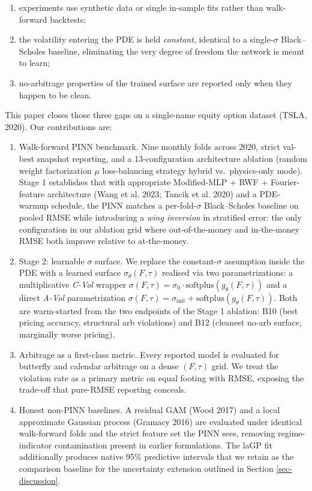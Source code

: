 \documentclass[
  11pt,
]{article}
\providecommand{\tightlist}{%
  \setlength{\itemsep}{0pt}\setlength{\parskip}{0pt}}
\begin{document}
\begin{enumerate}
\def\labelenumi{\arabic{enumi}.}
\tightlist
\item
  experiments use synthetic data or single in-sample fits rather than
  walk-forward backtests;
\item
  the volatility entering the PDE is held \emph{constant}, identical to
  a single-\(\sigma\) Black--Scholes baseline, eliminating the very
  degree of freedom the network is meant to learn;
\item
  no-arbitrage properties of the trained surface are reported only when
  they happen to be clean.
\end{enumerate}

This paper closes those three gaps on a single-name equity option
dataset (TSLA, 2020). Our contributions are:

\begin{enumerate}
\def\labelenumi{\arabic{enumi}.}
\item
  Walk-forward PINN benchmark. Nine monthly folds across 2020, strict
  val-best snapshot reporting, and a 13-configuration architecture
  ablation (random weight factorization \(\mu\) \times loss-balancing
  strategy \times hybrid vs.~physics-only mode). Stage 1 establishes
  that with appropriate Modified-MLP + RWF + Fourier-feature
  architecture (Wang et al. 2023; Tancik et al. 2020) and a PDE-warmup
  schedule, the PINN matches a per-fold-\(\sigma\) Black--Scholes
  baseline on pooled RMSE while introducing a \emph{wing inversion} in
  stratified error: the only configuration in our ablation grid where
  out-of-the-money and in-the-money RMSE both improve relative to
  at-the-money.
\item
  Stage 2: learnable \(\sigma\) surface. We replace the
  constant-\(\sigma\) assumption inside the PDE with a learned surface
  \(\sigma_\theta(F,\tau)\) realised via two parametrizations: a
  multiplicative \emph{C-Vol} wrapper
  \(\sigma(F,\tau) = \sigma_0 \cdot \mathrm{softplus}(g_\theta(F,\tau))\)
  and a direct \emph{A-Vol} parametrization
  \(\sigma(F,\tau) = \sigma_\mathrm{init} + \mathrm{softplus}(g_\theta(F,\tau))\).
  Both are warm-started from the two endpoints of the Stage 1 ablation:
  B10 (best pricing accuracy, structural arb violations) and B12
  (cleanest no-arb surface, marginally worse pricing).
\item
  Arbitrage as a first-class metric. Every reported model is evaluated
  for butterfly and calendar arbitrage on a dense \((F,\tau)\) grid. We
  treat the violation rate as a primary metric on equal footing with
  RMSE, exposing the trade-off that pure-RMSE reporting conceals.
\item
  Honest non-PINN baselines. A residual GAM (Wood 2017) and a local
  approximate Gaussian process (Gramacy 2016) are evaluated under
  identical walk-forward folds and the strict feature set the PINN sees,
  removing regime-indicator contamination present in earlier
  formulations. The laGP fit additionally produces native 95\%
  predictive intervals that we retain as the comparison baseline for the
  uncertainty extension outlined in Section \ref{sec-discussion}.
\end{enumerate}
\end{document}
